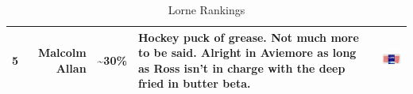 \documentclass[11pt, english]{article}
\begin{document}
\begin{table}[h]
\begin{center}
\begin{tabular}{rr|p{1.25cm}p{3.5cm}p{2.5cm}}
			5 & Malcolm Allan & \textasciitilde30\% & Hockey puck of grease. Not much more to be said. Alright in Aviemore as long as Ross isn't in charge with the deep fried in butter beta. & \vspace{-0.25cm}\includegraphics[width=2.5cm]{../System/Photos/ma_lorne.jpg}\\
			\hline
		\end{tabular}
			\caption{Lorne Rankings}
		\end{center}
		\end{table}

\newpage

	\renewcommand\refname{Bibliography}

	\fancyhead[L]{\leftmark}
\end{document}
